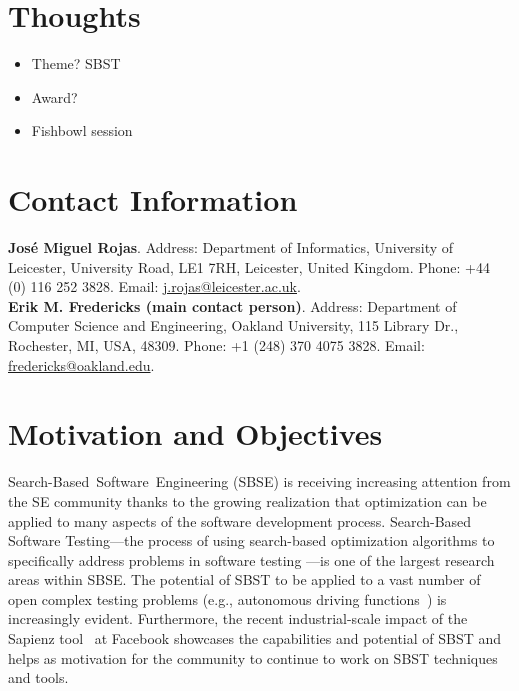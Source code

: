 \documentclass[10pt,conference]{IEEEtran}
\begin{document}

\section{Thoughts}

\begin{itemize}
\item Theme?  SBST 
\item Award?
\item Fishbowl session
\end{itemize}

\section{Contact Information}

\noindent \textbf{Jos\'e Miguel Rojas}. Address:
Department of Informatics, University of Leicester, University Road,
LE1 7RH, Leicester, United Kingdom. Phone: +44 (0) 116 252
3828. Email: \url{j.rojas@leicester.ac.uk}.\\
\textbf{Erik M. Fredericks (main contact person)}. Address:
Department of Computer Science and Engineering, Oakland University, 115 Library Dr.,
Rochester, MI, USA, 48309. Phone: +1 (248) 370 4075
3828. Email: \url{fredericks@oakland.edu}.

\section{Motivation and Objectives}
\label{sec:themes}
  
Search-Based~Software~Engineering (SBSE) \cite{mhbj:manifesto} is
receiving increasing attention from the SE community thanks to the
growing realization that optimization can be applied to many aspects
of the software development process.  Search-Based Software
Testing---the process of using search-based optimization algorithms to
specifically address problems in software testing
\cite{mcminn:survey}---is one of the largest research areas within
SBSE. The potential of SBST to be applied to a vast number of open
complex testing problems (e.g., autonomous driving
functions~\cite{Abdessalem2018}) is increasingly evident. Furthermore,
the recent industrial-scale impact of the Sapienz tool~\cite{Sapienz}
at Facebook%
showcases the capabilities and potential
of SBST and helps as motivation for the community to continue to work
on SBST techniques and tools.
\end{document}
